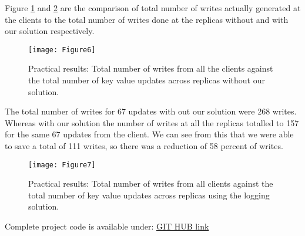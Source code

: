 Figure \ref{fig:10} and \ref{fig:11} are the comparison of total number of writes actually generated at the clients to the total number of writes done at the replicas without and with our solution respectively.

\begin{figure}[!htbp]
    \centering
    \texttt{[image: Figure6]}
    \caption{Practical results: Total number of writes from all the clients against the total number of key value updates across replicas without our solution.}
    \label{fig:10}
\end{figure}


The total number of writes for 67 updates with out our solution were 268 writes. Whereas with our solution the number of writes at all the replicas totalled to 157 for the same 67 updates from the client. We can see from this that we were able to save a total of 111 writes, so there was a reduction of 58 percent of writes.

\begin{figure}[!htbp]
    \centering
    \texttt{[image: Figure7]}
    \caption{Practical results: Total number of writes from all clients against the total number of key value updates across replicas using the logging solution.}
    \label{fig:11}
\end{figure}

Complete project code is available under: \href{https://github.com/Narendrakumarg1728/write_reduction_in_Distributed_replicas}{GIT HUB link}

\newpage
